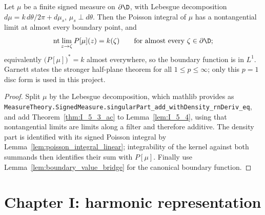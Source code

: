 \begin{theorem}[Garnett I.5.3: Fatou theorem, $p=1$ disc form]
  \label{thm:I_5_3}
  \leanok
  \mainline
  Let $\mu$ be a finite signed measure on $\partial\D$, with Lebesgue
  decomposition $d\mu=k\,d\theta/2\pi+d\mu_s$, $\mu_s\perp d\theta$. Then the
  Poisson integral of $\mu$ has a nontangential limit at almost every boundary
  point, and
  \[
    \operatorname{nt}\lim_{z\to\zeta}P[\mu](z)=k(\zeta)
    \qquad\text{for almost every }\zeta\in\partial\D;
  \]
  equivalently $\bigl(P[\mu]\bigr)^*=k$ almost everywhere, so the boundary
  function is in $L^1$. Garnett states the stronger half-plane theorem for all
  $1\le p\le\infty$; only this $p=1$ disc form is used in this project.
  \begin{proof}
    \leanok
    Split $\mu$ by the Lebesgue decomposition, which mathlib provides as
    \texttt{MeasureTheory.SignedMeasure.singularPart\_add\_withDensity\_rnDeriv\_eq}, and add
    Theorem~\ref{thm:I_5_3_ac} to Lemma~\ref{lem:I_5_4}, using that
    nontangential limits are limits along a filter and therefore additive.
    The density part is identified with its signed Poisson integral by
    Lemma~\ref{lem:poisson_integral_linear}; integrability of the kernel
    against both summands then identifies their sum with $P[\mu]$. Finally use
    Lemma~\ref{lem:boundary_value_bridge} for the canonical boundary function.
  \end{proof}
\end{theorem}

\section{Chapter I: harmonic representation}


